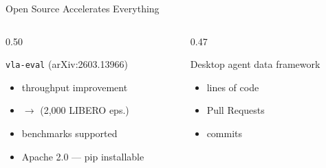\begin{frame}{Open Source Accelerates Everything}
\vspace{0.3em}
\begin{columns}[T]
  \begin{column}{0.50\textwidth}
    \begin{methodbox}
      \vspace{0.2em}
      \texttt{vla-eval} (arXiv:2603.13966)\\[0.4em]
      \begin{itemize}\setlength\itemsep{0.2em}
        \item[\footnotesize$\bullet$] \footnotesize {} throughput improvement
        \item[\footnotesize$\bullet$] \footnotesize {} $\rightarrow$  (2,000 LIBERO eps.)
        \item[\footnotesize$\bullet$] \footnotesize {} benchmarks supported
        \item[\footnotesize$\bullet$] \footnotesize Apache 2.0 — pip installable
      \end{itemize}
    \end{methodbox}
  \end{column}
  \begin{column}{0.47\textwidth}
    \begin{methodbox}
      \vspace{0.2em}
      Desktop agent data framework\\[0.4em]
      \begin{itemize}\setlength\itemsep{0.2em}
        \item[\footnotesize$\bullet$] \footnotesize {} lines of code
        \item[\footnotesize$\bullet$] \footnotesize {} Pull Requests
        \item[\footnotesize$\bullet$] \footnotesize {} commits
      \end{itemize}
    \end{methodbox}
  \end{column}
\end{columns}
\end{frame}

